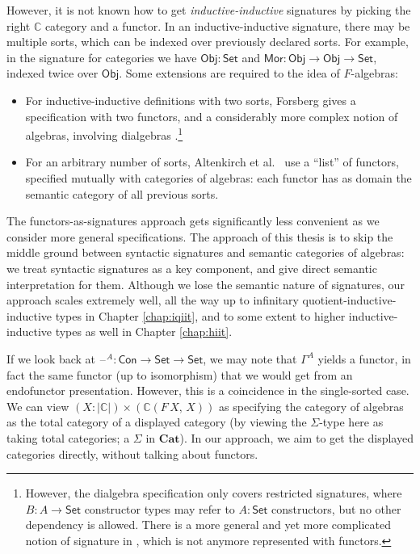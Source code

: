 \documentclass[12pt,a4paper,twoside,openany]{book}
\theoremstyle{remark}
\theoremstyle{definition}
\theoremstyle{theorem}
\newcommand{\ms}[1]{\mathsf{#1}}
\newcommand{\mbb}[1]{\mathbb{#1}}
\newcommand{\mbf}[1]{\mathbf{#1}}
\newcommand{\Con}{\mathsf{Con}}
\newcommand{\blank}{\mathord{\hspace{1pt}\text{--}\hspace{1pt}}}
\newcommand{\Set}{\mathsf{Set}}
\newcommand{\Mor}{\ms{Mor}}
\newcommand{\Obj}{\ms{Obj}}
\begin{document}
However, it is not known how to get \emph{inductive-inductive} signatures by
picking the right $\mbb{C}$ category and a functor. In an inductive-inductive
signature, there may be multiple sorts, which can be indexed over previously
declared sorts. For example, in the signature for categories we have $\Obj :
\Set$ and $\Mor : \Obj \to \Obj \to \Set$, indexed twice over $\Obj$. Some
extensions are required to the idea of $F$-algebras:
\begin{itemize}
\item
  For inductive-inductive definitions with two sorts, Forsberg gives a
  specification with two functors, and a considerably more complex notion of
  algebras, involving dialgebras \cite{forsberg-phd}.\footnote{However, the
  dialgebra specification only covers restricted signatures, where $B : A \to
  \Set$ constructor types may refer to $A : \Set$ constructors, but no other
  dependency is allowed.  There is a more general and yet more complicated
  notion of signature in \cite{forsberg-phd}, which is not anymore represented
  with functors.}
\item
  For an arbitrary number of sorts, Altenkirch et
  al.\ \cite{altenkirch18qiit} use a ``list'' of functors, specified mutually
  with categories of algebras: each functor has as domain the semantic category
  of all previous sorts.
\end{itemize}

The functors-as-signatures approach gets significantly less convenient as we
consider more general specifications. The approach of this thesis is to skip the
middle ground between syntactic signatures and semantic categories of algebras:
we treat syntactic signatures as a key component, and give direct semantic
interpretation for them. Although we lose the semantic nature of signatures,
our approach scales extremely well, all the way up to infinitary
quotient-inductive-inductive types in Chapter \ref{chap:iqiit}, and to some
extent to higher inductive-inductive types as well in Chapter \ref{chap:hiit}.

If we look back at $\blank^A : \Con \to \Set \to \Set$, we may note that
$\Gamma^A$ yields a functor, in fact the same functor (up to isomorphism) that
we would get from an endofunctor presentation. However, this is a coincidence in
the single-sorted case. We can view $(X : |\mbb{C}|) \times (\mbb{C}(F\,X,\,X))$
as specifying the category of algebras as the total category of a displayed
category (by viewing the $\Sigma$-type here as taking total categories; a
$\Sigma$ in $\mbf{Cat}$). In our approach, we aim to get the displayed
categories directly, without talking about functors.
\end{document}
